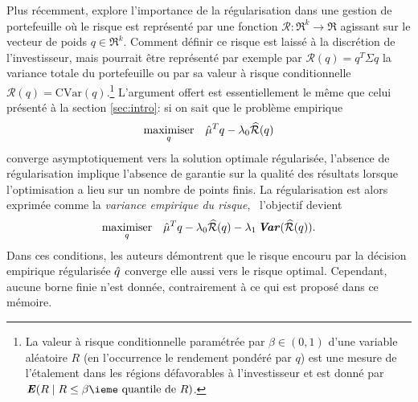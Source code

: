 Plus récemment, \cite{ban2016machine} explore l'importance de la régularisation dans une
gestion de portefeuille où le risque est représenté par une fonction
$\mathcal{R}:\Re^k \to \Re$ agissant sur le vecteur de poids $q \in \Re^k$. Comment définir ce
risque est laissé à la discrétion de l'investisseur, mais pourrait être représenté par
exemple par $\mathcal{R}(q) = q^T\Sigma q$ la variance totale du portefeuille ou par sa
valeur à risque conditionnelle $\mathcal{R}(q) = \mathrm{CVar}(q)$.\footnote{La valeur à
  risque conditionnelle paramétrée par $\beta\in(0,1)$ d'une variable aléatoire $R$ (en
  l'occurrence le rendement pondéré par $q$) est une mesure de l'étalement dans les
  régions défavorables à l'investisseur et est donné par
  $\E (R \mid R \leq \text{$\beta$\ieme quantile de $R$})$.} L'argument offert est essentiellement
le même que celui présenté à la section \ref{sec:intro}: si on sait que le problème
empirique
\begin{equation}
  \maximizeEquation[q]{\hat \mu^Tq - \lambda_0\widehat{\mathcal{R}}(q)}
\end{equation}
converge asymptotiquement vers la solution optimale régularisée, l'absence de
régularisation implique l'absence de garantie sur la qualité des résultats lorsque
l'optimisation a lieu sur un nombre de points finis. La régularisation est alors exprimée
comme la \textit{variance empirique du risque}, \ie\ l'objectif devient
\begin{equation}
  \maximizeEquation[q]{\hat \mu^Tq - \lambda_0\widehat{\mathcal{R}}(q) - \lambda_1\Var(\widehat{\mathcal{R}}(q)).}
\end{equation}
Dans ces conditions, les auteurs démontrent que le risque encouru par la décision
empirique régularisée $\qh$ converge elle aussi vers le risque optimal. Cependant, aucune
borne finie n'est donnée, contrairement à ce qui est proposé dans ce mémoire.

